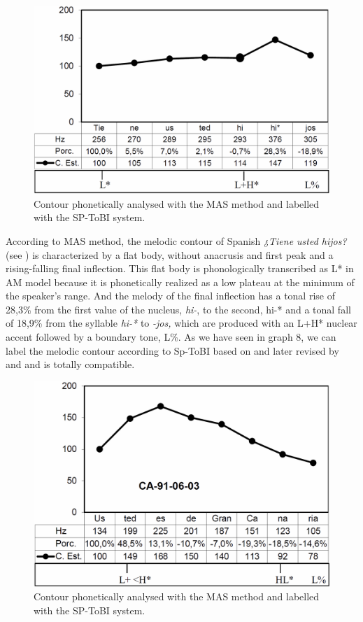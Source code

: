 \documentclass[output=paper]{langscibook}
\begin{document}
\begin{figure}{}
\includegraphics[width=\textwidth]{figures/FON-img13.PNG}
\caption{Contour phonetically analysed with the MAS method and labelled with the SP-ToBI system.}
\label{graph:font:8}
\end{figure}

According to MAS method, the melodic contour of Spanish \textit{¿Tiene usted hijos?} (see ) is characterized by a flat body, without anacrusis and first peak and a rising-falling final inflection. This flat body is phonologically transcribed as L* in AM model because it is phonetically realized as a low plateau at the minimum of the speaker’s range. And the melody of the final inflection has a tonal rise of 28,3\% from the first value of the nucleus, \textit{hi-}, to the second, hi-*  and a tonal fall of 18,9\% from the syllable \textit{hi-*} to \textit{-jos,} which are produced with an L+H* nuclear accent followed by a boundary tone, L\%. As we have seen in graph 8, we can label the melodic contour according to Sp-ToBI based on \citet{Beckman.2002} and later revised by \citet{FacePrieto.2007} and \citet{EstebasVilaplanaPrieto.2008} and is totally compatible.

\begin{figure}
\includegraphics[width=\textwidth]{figures/FON-img14.PNG}
\caption{Contour phonetically analysed with the MAS method and labelled with the SP-ToBI system.}
\label{graph:font:9}
\end{figure}
\end{document}
